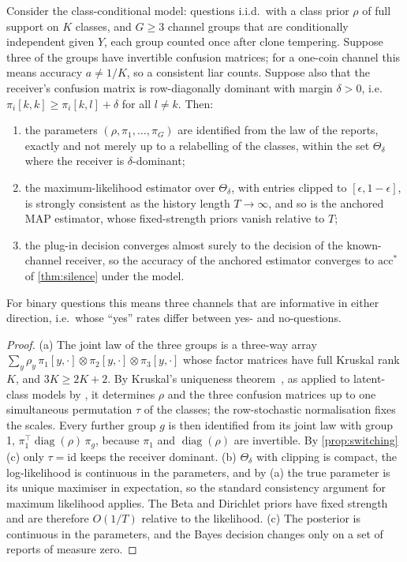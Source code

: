 \begin{theorem}\label{thm:consistency}
Consider the class-conditional model: questions i.i.d.\ with a class prior $\rho$ of full support on $K$ classes, and $G\ge3$ channel groups that are conditionally independent given $Y$, each group counted once after clone tempering. Suppose three of the groups have invertible confusion matrices; for a one-coin channel this means accuracy $a\ne1/K$, so a consistent liar counts. Suppose also that the receiver's confusion matrix is row-diagonally dominant with margin $\delta>0$, i.e.\ $\pi_i[k,k]\ge\pi_i[k,l]+\delta$ for all $l\ne k$. Then:
\begin{enumerate}[label=(\alph*)]
\item the parameters $(\rho,\pi_1,\dots,\pi_G)$ are identified from the law of the reports, exactly and not merely up to a relabelling of the classes, within the set $\Theta_\delta$ where the receiver is $\delta$-dominant;
\item the maximum-likelihood estimator over $\Theta_\delta$, with entries clipped to $[\epsilon,1-\epsilon]$, is strongly consistent as the history length $T\to\infty$, and so is the anchored MAP estimator, whose fixed-strength priors vanish relative to $T$;
\item the plug-in decision converges almost surely to the decision of the known-channel receiver, so the accuracy of the anchored estimator converges to $\mathrm{acc}^*$ of \cref{thm:silence} under the model.
\end{enumerate}
For binary questions this means three channels that are informative in either direction, i.e.\ whose ``yes'' rates differ between yes- and no-questions.
\end{theorem}
\begin{proof}
(a) The joint law of the three groups is a three-way array $\sum_y\rho_y\,\pi_1[y,\cdot]\otimes\pi_2[y,\cdot]\otimes\pi_3[y,\cdot]$ whose factor matrices have full Kruskal rank $K$, and $3K\ge2K+2$. By Kruskal's uniqueness theorem~\citep{kruskal1977}, as applied to latent-class models by \citet{allman2009}, it determines $\rho$ and the three confusion matrices up to one simultaneous permutation $\tau$ of the classes; the row-stochastic normalisation fixes the scales. Every further group $g$ is then identified from its joint law with group 1, $\pi_1^{\top}\operatorname{diag}(\rho)\,\pi_g$, because $\pi_1$ and $\operatorname{diag}(\rho)$ are invertible. By \cref{prop:switching}(c) only $\tau=\mathrm{id}$ keeps the receiver dominant. (b) $\Theta_\delta$ with clipping is compact, the log-likelihood is continuous in the parameters, and by (a) the true parameter is its unique maximiser in expectation, so the standard consistency argument for maximum likelihood applies. The Beta and Dirichlet priors have fixed strength and are therefore $O(1/T)$ relative to the likelihood. (c) The posterior is continuous in the parameters, and the Bayes decision changes only on a set of reports of measure zero.
\end{proof}
